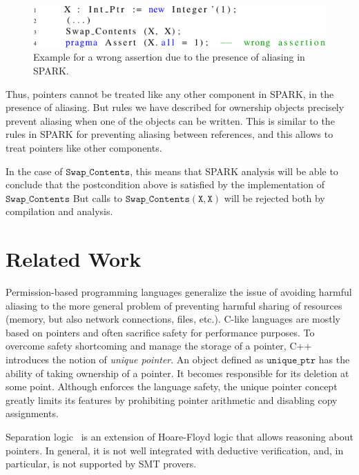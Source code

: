 \documentclass{llncs}
\newcommand\var[1]{\ensuremath{\mathtt{#1}}}
\begin{document}
\begin{figure}[htb!]
\centering
  \captionsetup{justification=centering,margin=0.6cm}
   \includegraphics[]{spark_ex1_exp}
	\caption{Example for a wrong assertion due to the presence of aliasing in SPARK.}
   \label{fig:spark_ex1_exp}
\end{figure}

\smallskip
Thus, pointers cannot be treated like any other component in SPARK, in the presence of aliasing. But rules we have described for ownership objects precisely prevent
aliasing when one of the objects can be written. This is similar to the rules in SPARK for preventing aliasing between references, and this allows to treat pointers
like other components.

\smallskip
In the case of \var{Swap\_Contents}, this means that SPARK analysis will be able to conclude that the postcondition above is satisfied by the implementation of \var{Swap\_Contents}
But calls to \var{Swap\_Contents(X,X)} will be rejected both by compilation and analysis.


\section{Related Work}


Permission-based programming languages generalize the issue of avoiding harmful aliasing to the more general problem of preventing harmful sharing of resources
(memory, but also network connections, files, etc.). C-like languages are mostly based on pointers and often sacrifice safety for performance purposes.
To overcome safety shortcoming and manage the storage of a pointer, C++ introduces the notion of \textit{unique pointer}. An object defined as \var{unique\_ptr}
has the ability of taking ownership of a pointer. It becomes responsible for its deletion at some point. Although enforces the language safety, the unique
pointer concept greatly limits its features by prohibiting pointer arithmetic and disabling copy assignments.

\smallskip
Separation logic~\cite{Reynolds02} is an extension of Hoare-Floyd logic that allows reasoning about pointers. In general, it is not well integrated with deductive
verification, and, in particular, is not supported by SMT provers.
\end{document}
